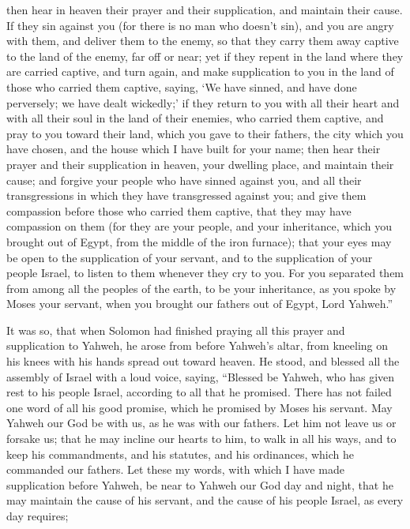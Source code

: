 {then hear in heaven their prayer and their supplication, and maintain their cause.
If they sin against you (for there is no man who doesn’t sin), and you are angry with them, and deliver them to the enemy, so that they carry them away captive to the land of the enemy, far off or near;
yet if they repent in the land where they are carried captive, and turn again, and make supplication to you in the land of those who carried them captive, saying, ‘We have sinned, and have done perversely; we have dealt wickedly;’
if they return to you with all their heart and with all their soul in the land of their enemies, who carried them captive, and pray to you toward their land, which you gave to their fathers, the city which you have chosen, and the house which I have built for your name;
then hear their prayer and their supplication in heaven, your dwelling place, and maintain their cause;
and forgive your people who have sinned against you, and all their transgressions in which they have transgressed against you; and give them compassion before those who carried them captive, that they may have compassion on them
(for they are your people, and your inheritance, which you brought out of Egypt, from the middle of the iron furnace);
that your eyes may be open to the supplication of your servant, and to the supplication of your people Israel, to listen to them whenever they cry to you.
For you separated them from among all the peoples of the earth, to be your inheritance, as you spoke by Moses your servant, when you brought our fathers out of Egypt, Lord Yahweh.”
\par }{\PP {}It was so, that when Solomon had finished praying all this prayer and supplication to Yahweh, he arose from before Yahweh’s altar, from kneeling on his knees with his hands spread out toward heaven.
He stood, and blessed all the assembly of Israel with a loud voice, saying,
“Blessed be Yahweh, who has given rest to his people Israel, according to all that he promised. There has not failed one word of all his good promise, which he promised by Moses his servant.
May Yahweh our God be with us, as he was with our fathers. Let him not leave us or forsake us;
that he may incline our hearts to him, to walk in all his ways, and to keep his commandments, and his statutes, and his ordinances, which he commanded our fathers.
Let these my words, with which I have made supplication before Yahweh, be near to Yahweh our God day and night, that he may maintain the cause of his servant, and the cause of his people Israel, as every day requires;
}
